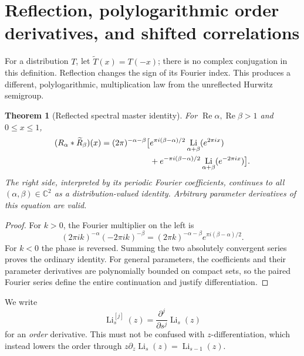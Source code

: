 \documentclass[11pt]{article}
\numberwithin{equation}{section}
\newtheorem{theorem}{Theorem}[section]
\theoremstyle{definition}
\theoremstyle{remark}
\DeclareMathOperator{\Li}{Li}
\DeclareMathOperator{\Rea}{Re}
\newcommand{\C}{\mathbb C}
\begin{document}
\section{Reflection, polylogarithmic order derivatives, and shifted correlations}
\label{sec:polylogs}
For a distribution $T$, let $\widetilde T(x)=T(-x)$; there is no complex
conjugation in this definition. Reflection changes the sign of its
Fourier index. This produces a different, polylogarithmic, multiplication
law from the unreflected Hurwitz semigroup.

\begin{theorem}[Reflected spectral master identity]\label{thm:reflected}
For $\Rea\alpha,\Rea\beta>1$ and $0\le x\le1$,
\begin{align}
 (R_\alpha*\widetilde R_\beta)(x)
 =(2\pi)^{-\alpha-\beta}\big[&e^{\pi i(\beta-\alpha)/2}
                  \Li_{\alpha+\beta}(e^{2\pi ix})\label{eq:reflected}\\
 &+e^{-\pi i(\beta-\alpha)/2}
                  \Li_{\alpha+\beta}(e^{-2\pi ix})\big].\notag
\end{align}
The right side, interpreted by its periodic Fourier coefficients,
continues to all $(\alpha,\beta)\in\C^2$ as a distribution-valued
identity. Arbitrary parameter derivatives of this equation are valid.
\end{theorem}
\begin{proof}
For $k>0$, the Fourier multiplier on the left is
\[
 (2\pi i k)^{-\alpha}(-2\pi i k)^{-\beta}
 =(2\pi k)^{-\alpha-\beta}e^{\pi i(\beta-\alpha)/2}.
\]
For $k<0$ the phase is reversed. Summing the two absolutely convergent
series proves the ordinary identity. For general parameters, the
coefficients and their parameter derivatives are polynomially bounded
on compact sets, so the paired Fourier series define the entire
continuation and justify differentiation.
\end{proof}

We write
\[
 \Li_s^{[j]}(z)=\frac{\partial^j}{\partial s^j}\Li_s(z)
\]
for an \emph{order} derivative. This must not be confused with
$z$-differentiation, which instead lowers the order through
$z\partial_z\Li_s(z)=\Li_{s-1}(z)$.
\end{document}
